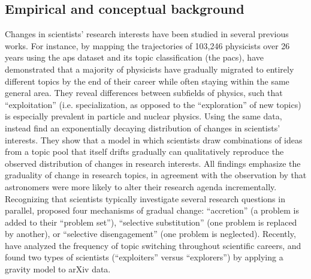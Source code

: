 \documentclass{article}
\begin{document}
\subsection{\label{sec:conceptual}Empirical and conceptual background}

Changes in scientists' research interests have been studied in several previous works. For instance, by mapping the trajectories of 103,246 physicists over 26 years using the \gls{aps} dataset and its topic classification (the \gls{pacs}), \citet{Aleta2019} have demonstrated that a majority of physicists have gradually migrated to entirely different topics by the end of their career while often staying within the same general area. They reveal differences between subfields of physics, such that ``exploitation'' (i.e. specialization, as opposed to the ``exploration'' of new topics) is especially prevalent in particle and nuclear physics.  Using the same data, \citet{Jia2017} instead find an exponentially decaying distribution of changes in scientists' interests. %
They show that a model in which scientists draw combinations of ideas from a topic pool that itself drifts gradually can qualitatively reproduce the observed distribution of changes in research interests. All findings emphasize the graduality of change in research topics, in agreement with the observation by \citet{Gieryn1978} that astronomers were more likely to alter their research agenda incrementally. Recognizing that scientists typically investigate several research questions in parallel, \citeauthor{Gieryn1978} proposed four mechanisms of gradual change: ``accretion'' (a problem is added to their ``problem set''),  ``selective substitution'' (one problem is replaced by another), or ``selective disengagement'' (one problem is neglected). Recently, \citet{Zeng2019} have analyzed the frequency of topic switching throughout scientific careers, and \citet{Chakresh2023} found two types of scientists (``exploiters'' versus ``explorers'') by applying a gravity model to arXiv data.
\end{document}
